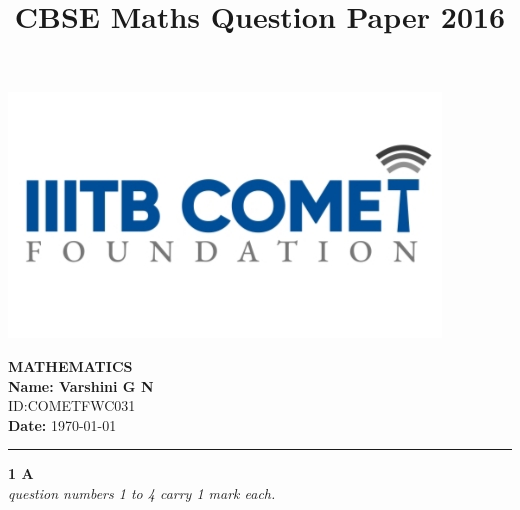 \documentclass[12pt,a4paper]{article}
\begin{document}
\begin{center}
\begin{minipage}{0.2\textwidth}
    \includegraphics[width=\linewidth]{iiit_logo.png} %
\end{minipage}
\hfill
\begin{minipage}{0.75\textwidth}
    \centering
    {\Large \textbf{MATHEMATICS}}\\[1ex]
    \textbf{Name: Varshini G N} \\[0.5ex]
    ID:COMETFWC031\\
    \textbf{Date:} \today
\end{minipage}
\end{center}

\vspace{1em}
\title{CBSE Maths Question Paper 2016}
\hrule
\vspace{1em}


\begin{center}
\textbf{1 A} \\
\textit{question numbers 1 to 4 carry 1 mark each.}
\end{center}
\end{document}
